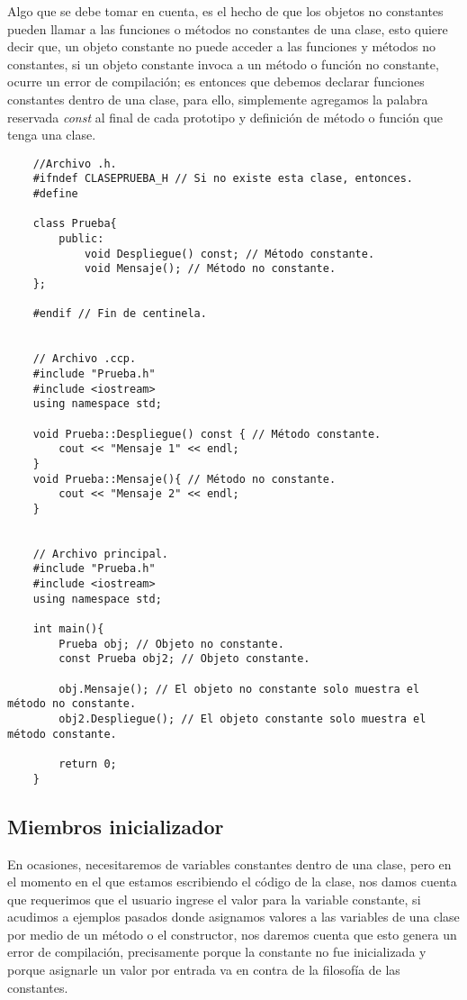 Algo que se debe tomar en cuenta, es el hecho de que los objetos no constantes pueden llamar a las funciones o métodos no constantes de una clase, esto quiere decir que, un objeto constante no puede acceder a las funciones y métodos no constantes, si un objeto constante invoca a un método o función no constante, ocurre un error de compilación; es entonces que debemos declarar funciones constantes dentro de una clase, para ello, simplemente agregamos la palabra reservada \textit{const} al final de cada prototipo y definición de método o función que tenga una clase.
\begin{lstlisting}
    //Archivo .h.
    #ifndef CLASEPRUEBA_H // Si no existe esta clase, entonces.
    #define
    
    class Prueba{
        public:
            void Despliegue() const; // Método constante.
            void Mensaje(); // Método no constante.
    };
    
    #endif // Fin de centinela.

    
    // Archivo .ccp.
    #include "Prueba.h"
    #include <iostream>
    using namespace std;
    
    void Prueba::Despliegue() const { // Método constante.
        cout << "Mensaje 1" << endl;
    }
    void Prueba::Mensaje(){ // Método no constante.
        cout << "Mensaje 2" << endl;
    }

    
    // Archivo principal.
    #include "Prueba.h"
    #include <iostream>
    using namespace std;
    
    int main(){
        Prueba obj; // Objeto no constante.
        const Prueba obj2; // Objeto constante.
        
        obj.Mensaje(); // El objeto no constante solo muestra el método no constante.
        obj2.Despliegue(); // El objeto constante solo muestra el método constante.
        
        return 0;
    }
\end{lstlisting}


\subsection{Miembros inicializador}

En ocasiones, necesitaremos de variables constantes dentro de una clase, pero en el momento en el que estamos escribiendo el código de la clase, nos damos cuenta que requerimos que el usuario ingrese el valor para la variable constante, si acudimos a ejemplos pasados donde asignamos valores a las variables de una clase por medio de un método o el constructor, nos daremos cuenta que esto genera un error de compilación, precisamente porque la constante no fue inicializada y porque asignarle un valor por entrada va en contra de la filosofía de las constantes.

